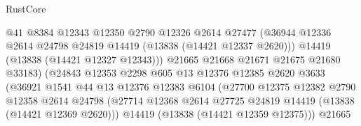 \begin{lexlean}{RustCore}
\begin{coremodule}
                                      @41
                                      @8384
                                      @12343
                                      @12350
                                      @2790
                                      @12326
                                      @2614
                                      @27477
                                      (@36944
                                        @12336
                                        @2614
                                        @24798
                                        @24819
                                        @14419
                                        (@13838 (@14421 @12337 @2620)))
                                      @14419
                                      (@13838 (@14421 @12327 @12343)))
                                    @21665
                                    @21668
                                    @21671
                                    @21675
                                    @21680
                                    @33183)
                                  (@24843
                                    @12353
                                    @2298
                                    @605
                                    @13
                                    @12376
                                    @12385
                                    @2620
                                    @3633
                                    (@36921
                                      @1541
                                      @44
                                      @13
                                      @12376
                                      @12383
                                      @6104
                                      (@27700
                                        @12375
                                        @12382
                                        @2790
                                        @12358
                                        @2614
                                        @24798
                                        (@27714
                                          @12368
                                          @2614
                                          @27725
                                          @24819
                                          @14419
                                          (@13838 (@14421 @12369 @2620)))
                                        @14419
                                        (@13838 (@14421 @12359 @12375)))
                                      @21665

\end{coremodule}
\end{lexlean}

